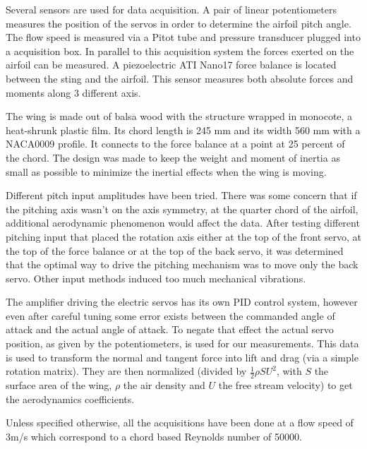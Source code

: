 \par Several sensors are used for data acquisition.
A pair of linear potentiometers measures the position of the servos in order to determine the airfoil pitch angle.
The flow speed is measured via a Pitot tube and pressure transducer plugged into a acquisition box.
In parallel to this acquisition system the forces exerted on the airfoil can be measured.
A piezoelectric ATI Nano17 force balance is located between the sting and the airfoil.
This sensor measures both absolute forces and moments along 3 different axis.

\par The wing is made out of balsa wood with the structure wrapped in monocote, a heat-shrunk plastic film.
Its chord length is 245 mm and its width 560 mm with a NACA0009 profile.
It connects to the force balance at a point at 25 percent of the chord.
The design was made to keep the weight and moment of inertia as small as possible to minimize the inertial effects when the wing is moving.


\FloatBarrier

Different pitch input amplitudes have been tried.
There was some concern that if the pitching axis wasn't on the axis symmetry, at the quarter chord of the airfoil, additional aerodynamic phenomenon would affect the data.
After testing different pitching input that placed the rotation axis either at the top of the front servo, at the top of the force balance or at the top of the back servo,  it was determined that the optimal way to drive the pitching mechanism was to move only the back servo.
Other input methods induced too much mechanical vibrations.

\par The amplifier driving the electric servos has its own PID control system, however even after careful tuning some error exists between the commanded angle of attack and the actual angle of attack.
To negate that effect the actual servo position, as given by the potentiometers, is used for our measurements.
This data is used to transform the normal and tangent force into lift and drag (via a simple rotation matrix). 
They are then normalized (divided by $\frac{1}{2}\rho S U^2$, with $S$ the surface area of the wing, $\rho$ the air density and $U$ the free stream velocity) to get the aerodynamics coefficients.

\par Unless specified otherwise, all the acquisitions have been done at a flow speed of 3m/s which correspond to a chord based Reynolds number of 50000.

